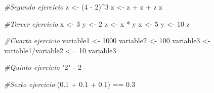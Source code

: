 \documentclass[]{tufte-book}
\newenvironment{Shaded}{}{}
\newcommand{\CommentTok}[1]{\textcolor[rgb]{0.38,0.63,0.69}{\textit{#1}}}
\newcommand{\DecValTok}[1]{\textcolor[rgb]{0.25,0.63,0.44}{#1}}
\newcommand{\FloatTok}[1]{\textcolor[rgb]{0.25,0.63,0.44}{#1}}
\newcommand{\NormalTok}[1]{#1}
\newcommand{\OtherTok}[1]{\textcolor[rgb]{0.00,0.44,0.13}{#1}}
\newcommand{\SpecialCharTok}[1]{\textcolor[rgb]{0.25,0.44,0.63}{#1}}
\newcommand{\StringTok}[1]{\textcolor[rgb]{0.25,0.44,0.63}{#1}}
\begin{document}
\begin{Shaded}
\begin{Highlighting}[]
\CommentTok{\#Segundo ejercicio}
\NormalTok{z }\OtherTok{\textless{}{-}}\NormalTok{ (}\DecValTok{4} \SpecialCharTok{{-}} \DecValTok{2}\NormalTok{)}\SpecialCharTok{\^{}}\DecValTok{3}
\NormalTok{z }\OtherTok{\textless{}{-}}\NormalTok{ z }\SpecialCharTok{+}\NormalTok{ z }\SpecialCharTok{+}\NormalTok{ z}
\NormalTok{z}
\end{Highlighting}
\end{Shaded}

\begin{Shaded}
\begin{Highlighting}[]
\CommentTok{\#Tercer ejercicio}
\NormalTok{x }\OtherTok{\textless{}{-}} \DecValTok{3}
\NormalTok{y }\OtherTok{\textless{}{-}} \DecValTok{2}
\NormalTok{z }\OtherTok{\textless{}{-}}\NormalTok{ x }\SpecialCharTok{*}\NormalTok{ y}
\NormalTok{x }\OtherTok{\textless{}{-}} \DecValTok{5}
\NormalTok{y }\OtherTok{\textless{}{-}} \DecValTok{10}
\NormalTok{z}
\end{Highlighting}
\end{Shaded}

\begin{Shaded}
\begin{Highlighting}[]
\CommentTok{\#Cuarto ejercicio}
\NormalTok{variable1 }\OtherTok{\textless{}{-}} \DecValTok{1000}
\NormalTok{variable2 }\OtherTok{\textless{}{-}} \DecValTok{100}
\NormalTok{variable3 }\OtherTok{\textless{}{-}}\NormalTok{ variable1}\SpecialCharTok{/}\NormalTok{variable2 }\SpecialCharTok{\textless{}=} \DecValTok{10}
\NormalTok{variable3}
\end{Highlighting}
\end{Shaded}

\begin{Shaded}
\begin{Highlighting}[]
\CommentTok{\#Quinto ejercicio}
\StringTok{"2"} \SpecialCharTok{{-}} \DecValTok{2}
\end{Highlighting}
\end{Shaded}

\begin{Shaded}
\begin{Highlighting}[]
\CommentTok{\#Sexto ejercicio}
\NormalTok{(}\FloatTok{0.1} \SpecialCharTok{+} \FloatTok{0.1} \SpecialCharTok{+} \FloatTok{0.1}\NormalTok{) }\SpecialCharTok{==} \FloatTok{0.3}
\end{Highlighting}
\end{Shaded}
\end{document}

